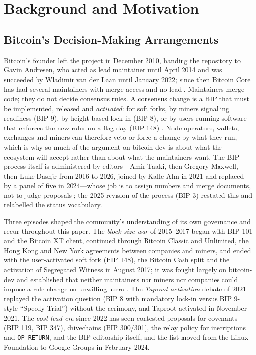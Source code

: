\section{Background and Motivation}
\label{sec:background}

\subsection{Bitcoin's Decision-Making Arrangements}

Bitcoin's founder left the project in December 2010, handing the repository to Gavin Andresen, who acted as lead maintainer until April 2014 and was succeeded by Wladimir van der Laan until January 2022; since then Bitcoin Core has had several maintainers with merge access and no lead \cite{bier2021}. Maintainers merge code; they do not decide consensus rules. A consensus change is a BIP that must be implemented, released and \emph{activated}: for soft forks, by miners signalling readiness (BIP 9), by height-based lock-in (BIP 8), or by users running software that enforces the new rules on a flag day (BIP 148) \cite{bip8, bip148}. Node operators, wallets, exchanges and miners can therefore veto or force a change by what they run, which is why so much of the argument on bitcoin-dev is about what the ecosystem will accept rather than about what the maintainers want. The BIP process itself is administered by editors---Amir Taaki, then Gregory Maxwell, then Luke Dashjr from 2016 to 2026, joined by Kalle Alm in 2021 and replaced by a panel of five in 2024---whose job is to assign numbers and merge documents, not to judge proposals \cite{bip2}; the 2025 revision of the process (BIP 3) restated this and relabelled the status vocabulary.

Three episodes shaped the community's understanding of its own governance and recur throughout this paper. The \emph{block-size war} of 2015--2017 began with BIP 101 and the Bitcoin XT client, continued through Bitcoin Classic and Unlimited, the Hong Kong and New York agreements between companies and miners, and ended with the user-activated soft fork (BIP 148), the Bitcoin Cash split and the activation of Segregated Witness in August 2017; it was fought largely on bitcoin-dev and established that neither maintainers nor miners nor companies could impose a rule change on unwilling users \cite{bier2021, defilippi2016}. The \emph{Taproot activation} debate of 2021 replayed the activation question (BIP 8 with mandatory lock-in versus BIP 9-style ``Speedy Trial'') without the acrimony, and Taproot activated in November 2021. The \emph{post-lead era} since 2022 has seen contested proposals for covenants (BIP 119, BIP 347), drivechains (BIP 300/301), the relay policy for inscriptions and \texttt{OP\_RETURN}, and the BIP editorship itself, and the list moved from the Linux Foundation to Google Groups in February 2024.

